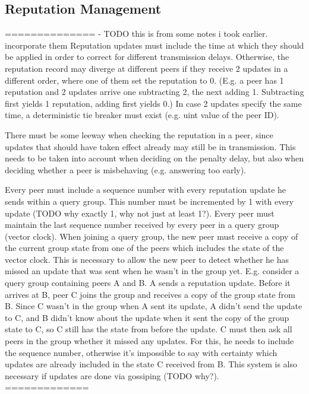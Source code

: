 \subsection{Reputation Management}
==============
- TODO this is from some notes i took earlier. incorporate them
Reputation updates must include the time at which they should be applied in
order to correct for different transmission delays. Otherwise, the reputation
record may diverge at different peers if they receive 2 updates in a different
order, where one of them set the reputation to 0. (E.g. a peer has 1 reputation
and 2 updates arrive one subtracting 2, the next adding 1. Subtracting first
yields 1 reputation, adding first yields 0.) In case 2 updates specify the same
time, a deterministic tie breaker must exist (e.g. uint value of the peer ID).

There must be some leeway when checking the reputation in a peer, since updates
that should have taken effect already may still be in transmission. This needs
to be taken into account when deciding on the penalty delay, but also when
deciding whether a peer is misbehaving (e.g. answering too early).

Every peer must include a sequence number with every reputation update he sends
within a query group. This number must be incremented by 1 with every update
(TODO why exactly 1, why not just at least 1?).
Every peer must maintain the last sequence number received by every peer in a
query group (vector clock). When joining a query group, the new peer must
receive a copy of the current group state from one of the peers which includes
the state of the vector clock. This is necessary to allow the new peer to detect
whether he has missed an update that was sent when he wasn't in the group yet.
E.g. consider a query group containing peers A and B. A sends a reputation
update. Before it arrives at B, peer C joins the group and receives a copy of
the group state from B. Since C wasn't in the group when A sent its update, A
didn't send the update to C, and B didn't know about the update when it sent the
copy of the group state to C, so C still has the state from before the update. C
must then ask all peers in the group whether it missed any updates. For this, he
needs to include the sequence number, otherwise it's impossible to say with
certainty which updates are already included in the state C received from B.
This system is also necessary if updates are done via gossiping (TODO why?).
=============

